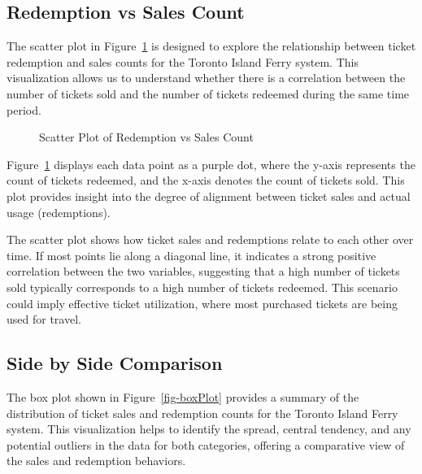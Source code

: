 \documentclass[
  letterpaper,
  DIV=11,
  numbers=noendperiod]{scrartcl}
\begin{document}
\subsection{Redemption vs Sales Count}\label{redemption-vs-sales-count}

The scatter plot in Figure~\ref{fig-scatterPlot} is designed to explore
the relationship between ticket redemption and sales counts for the
Toronto Island Ferry system. This visualization allows us to understand
whether there is a correlation between the number of tickets sold and
the number of tickets redeemed during the same time period.

\begin{figure}


\caption{\label{fig-scatterPlot}Scatter Plot of Redemption vs Sales
Count}

\end{figure}%

Figure~\ref{fig-scatterPlot} displays each data point as a purple dot,
where the y-axis represents the count of tickets redeemed, and the
x-axis denotes the count of tickets sold. This plot provides insight
into the degree of alignment between ticket sales and actual usage
(redemptions).

The scatter plot shows how ticket sales and redemptions relate to each
other over time. If most points lie along a diagonal line, it indicates
a strong positive correlation between the two variables, suggesting that
a high number of tickets sold typically corresponds to a high number of
tickets redeemed. This scenario could imply effective ticket
utilization, where most purchased tickets are being used for travel.

\newpage

\subsection{Side by Side Comparison}\label{side-by-side-comparison}

The box plot shown in Figure~\ref{fig-boxPlot} provides a summary of the
distribution of ticket sales and redemption counts for the Toronto
Island Ferry system. This visualization helps to identify the spread,
central tendency, and any potential outliers in the data for both
categories, offering a comparative view of the sales and redemption
behaviors.
\end{document}
